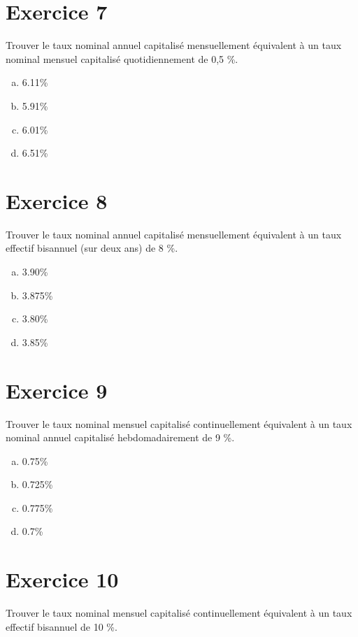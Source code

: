 \documentclass[10pt,a4paper]{article}
\begin{document}
\section*{Exercice 7}
Trouver le taux nominal annuel capitalisé mensuellement équivalent à un taux nominal mensuel capitalisé quotidiennement de 0,5 \%.



\begin{enumerate}[a)]
\item 6.11\%
\item 5.91\%
\item 6.01\%
\item 6.51\%
\end{enumerate}


\section*{Exercice 8}
Trouver le taux nominal annuel capitalisé mensuellement équivalent à un taux effectif bisannuel (sur deux ans) de 8 \%.
 


\begin{enumerate}[a)]
\item 3.90\%
\item 3.875\%
\item 3.80\%
\item 3.85\%
\end{enumerate}


\section*{Exercice 9}
Trouver le taux nominal mensuel capitalisé continuellement équivalent à un taux nominal annuel capitalisé hebdomadairement de 9 \%.




\begin{enumerate}[a)]
\item 0.75\%
\item 0.725\%
\item 0.775\%
\item 0.7\%
\end{enumerate}


\section*{Exercice 10}
Trouver le taux nominal mensuel capitalisé continuellement équivalent à un taux effectif bisannuel de 10 \%.
\end{document}

